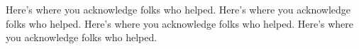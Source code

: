 


Here’s where you acknowledge folks who helped. Here’s where you acknowledge folks who helped. Here’s where you acknowledge folks who helped. Here’s where you acknowledge folks who helped.